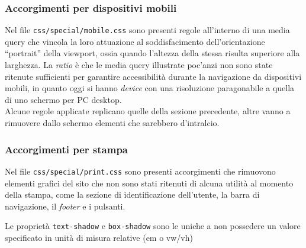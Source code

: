 \subsubsection{Accorgimenti per dispositivi mobili}
Nel file \texttt{css/special/mobile.css} sono presenti regole all'interno di una media query che vincola la loro attuazione al soddisfacimento dell'orientazione “portrait” della viewport, ossia quando l'altezza della stessa risulta superiore alla larghezza. La \textit{ratio} è che le media query illustrate poc'anzi non sono state ritenute sufficienti per garantire accessibilità durante la navigazione da dispositivi mobili, in quanto oggi si hanno \textit{device} con una risoluzione paragonabile a quella di uno schermo per PC desktop. \\
Alcune regole applicate replicano quelle della sezione precedente, altre vanno a rimuovere dallo schermo elementi che sarebbero d'intralcio.

\subsubsection{Accorgimenti per stampa}
Nel file \texttt{css/special/print.css} sono presenti accorgimenti che rimuovono elementi grafici del sito che non sono stati ritenuti di alcuna utilità al momento della stampa, come la sezione di identificazione dell'utente, la barra di navigazione, il \textit{footer} e i pulsanti. 



Le proprietà \texttt{text-shadow} e \texttt{box-shadow} sono le uniche a non possedere un valore specificato in unità di misura relative (em o vw/vh)